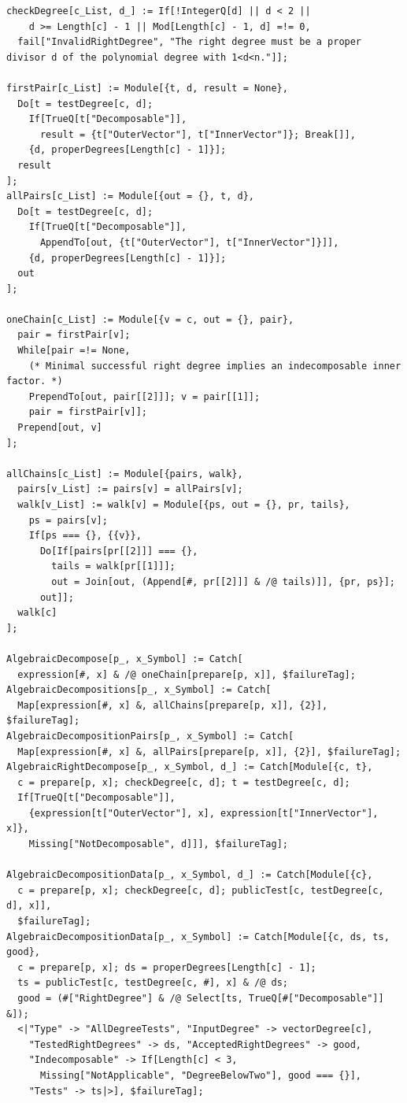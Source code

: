 \documentclass[11pt,a4paper]{article}
\numberwithin{equation}{section}
\theoremstyle{definition}
\theoremstyle{remark}
\begin{document}
\begin{lstlisting}
checkDegree[c_List, d_] := If[!IntegerQ[d] || d < 2 ||
    d >= Length[c] - 1 || Mod[Length[c] - 1, d] =!= 0,
  fail["InvalidRightDegree", "The right degree must be a proper divisor d of the polynomial degree with 1<d<n."]];

firstPair[c_List] := Module[{t, d, result = None},
  Do[t = testDegree[c, d];
    If[TrueQ[t["Decomposable"]],
      result = {t["OuterVector"], t["InnerVector"]}; Break[]],
    {d, properDegrees[Length[c] - 1]}];
  result
];
allPairs[c_List] := Module[{out = {}, t, d},
  Do[t = testDegree[c, d];
    If[TrueQ[t["Decomposable"]],
      AppendTo[out, {t["OuterVector"], t["InnerVector"]}]],
    {d, properDegrees[Length[c] - 1]}];
  out
];

oneChain[c_List] := Module[{v = c, out = {}, pair},
  pair = firstPair[v];
  While[pair =!= None,
    (* Minimal successful right degree implies an indecomposable inner factor. *)
    PrependTo[out, pair[[2]]]; v = pair[[1]];
    pair = firstPair[v]];
  Prepend[out, v]
];

allChains[c_List] := Module[{pairs, walk},
  pairs[v_List] := pairs[v] = allPairs[v];
  walk[v_List] := walk[v] = Module[{ps, out = {}, pr, tails},
    ps = pairs[v];
    If[ps === {}, {{v}},
      Do[If[pairs[pr[[2]]] === {},
        tails = walk[pr[[1]]];
        out = Join[out, (Append[#, pr[[2]]] & /@ tails)]], {pr, ps}];
      out]];
  walk[c]
];

AlgebraicDecompose[p_, x_Symbol] := Catch[
  expression[#, x] & /@ oneChain[prepare[p, x]], $failureTag];
AlgebraicDecompositions[p_, x_Symbol] := Catch[
  Map[expression[#, x] &, allChains[prepare[p, x]], {2}], $failureTag];
AlgebraicDecompositionPairs[p_, x_Symbol] := Catch[
  Map[expression[#, x] &, allPairs[prepare[p, x]], {2}], $failureTag];
AlgebraicRightDecompose[p_, x_Symbol, d_] := Catch[Module[{c, t},
  c = prepare[p, x]; checkDegree[c, d]; t = testDegree[c, d];
  If[TrueQ[t["Decomposable"]],
    {expression[t["OuterVector"], x], expression[t["InnerVector"], x]},
    Missing["NotDecomposable", d]]], $failureTag];

AlgebraicDecompositionData[p_, x_Symbol, d_] := Catch[Module[{c},
  c = prepare[p, x]; checkDegree[c, d]; publicTest[c, testDegree[c, d], x]],
  $failureTag];
AlgebraicDecompositionData[p_, x_Symbol] := Catch[Module[{c, ds, ts, good},
  c = prepare[p, x]; ds = properDegrees[Length[c] - 1];
  ts = publicTest[c, testDegree[c, #], x] & /@ ds;
  good = (#["RightDegree"] & /@ Select[ts, TrueQ[#["Decomposable"]] &]);
  <|"Type" -> "AllDegreeTests", "InputDegree" -> vectorDegree[c],
    "TestedRightDegrees" -> ds, "AcceptedRightDegrees" -> good,
    "Indecomposable" -> If[Length[c] < 3,
      Missing["NotApplicable", "DegreeBelowTwo"], good === {}],
    "Tests" -> ts|>], $failureTag];


\end{lstlisting}
\end{document}
